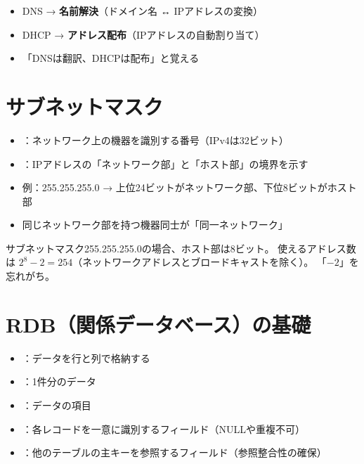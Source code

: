 \begin{pitfall}[DNSとDHCPの混同]
\begin{itemize}
  \item DNS → \textbf{名前解決}（ドメイン名 ↔ IPアドレスの変換）
  \item DHCP → \textbf{アドレス配布}（IPアドレスの自動割り当て）
  \item 「DNSは翻訳、DHCPは配布」と覚える
\end{itemize}
\end{pitfall}

\section{サブネットマスク}

\begin{teigi}[IPアドレスとサブネットマスク]
\begin{itemize}
  \item {}：ネットワーク上の機器を識別する番号（IPv4は32ビット）
  \item {}：IPアドレスの「ネットワーク部」と「ホスト部」の境界を示す
  \item 例：255.255.255.0 → 上位24ビットがネットワーク部、下位8ビットがホスト部
  \item 同じネットワーク部を持つ機器同士が「同一ネットワーク」
\end{itemize}
\end{teigi}

\begin{pitfall}[サブネットマスクの計算ミス]
サブネットマスク255.255.255.0の場合、ホスト部は8ビット。
使えるアドレス数は $2^8 - 2 = 254$（ネットワークアドレスとブロードキャストを除く）。
「$-2$」を忘れがち。
\end{pitfall}

\section{RDB（関係データベース）の基礎}

\begin{teigi}[RDBの基本用語]
\begin{itemize}
  \item {}：データを行と列で格納する
  \item {}：1件分のデータ
  \item {}：データの項目
  \item {}：各レコードを一意に識別するフィールド（NULLや重複不可）
  \item {}：他のテーブルの主キーを参照するフィールド（参照整合性の確保）
\end{itemize}
\end{teigi}

